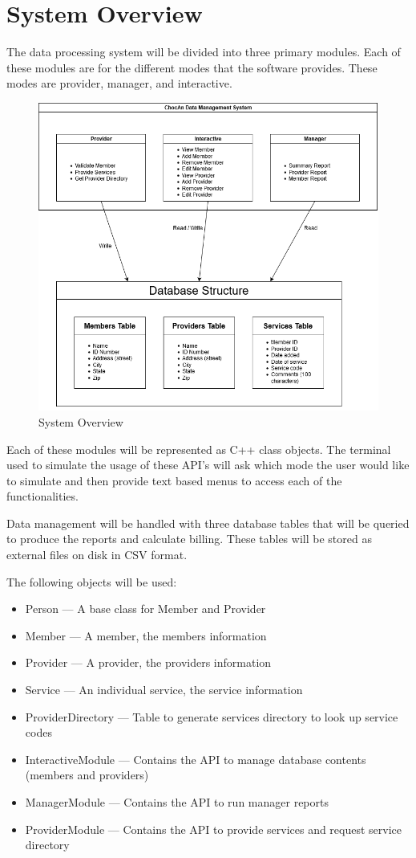 \documentclass{article}
\begin{document}
\section{System Overview}
The data processing system will be divided into three primary modules. Each of these modules are for the different modes that the software provides. These modes are provider, manager, and interactive.

  \begin{figure}[h!]
	\centering
	\includegraphics[width=0.8\linewidth]{SystemOverview.png}
	\caption[System Overview]{System Overview}
	\label{fig:P1compileP0-1}
  \end{figure}

Each of these modules will be represented as C++ class objects. The terminal used to simulate the usage of these API’s will ask which mode the user would like to simulate and then provide text based menus to access each of the functionalities.

Data management will be handled with three database tables that will be queried to produce the reports and calculate billing. These tables will be stored as external files on disk in CSV format.

The following objects will be used:
\begin{itemize}
   \item Person --- A base class for Member and Provider
   \item Member --- A member, the members information
   \item Provider --- A provider, the providers information
   \item Service --- An individual service, the service information
   \item ProviderDirectory --- Table to generate services directory to look up service codes
   \item InteractiveModule --- Contains the API to manage database contents (members and providers)
   \item ManagerModule --- Contains the API to run manager reports
   \item ProviderModule --- Contains the API to provide services and request service directory
\end{itemize}
\end{document}
